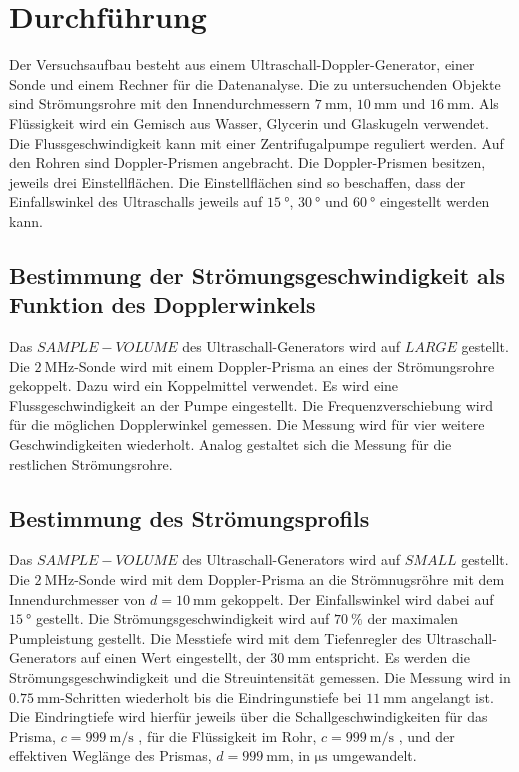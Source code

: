 \section{Durchführung}
\label{sec:Durchführung}
Der Versuchsaufbau besteht aus einem Ultraschall-Doppler-Generator, einer Sonde und einem Rechner für die Datenanalyse.
Die zu untersuchenden Objekte sind Strömungsrohre mit den Innendurchmessern $\SI{7}{\milli\meter}$, $\SI{10}{\milli\meter}$ und $\SI{16}{\milli\meter}$.
Als Flüssigkeit wird ein Gemisch aus Wasser, Glycerin und Glaskugeln verwendet.
Die Flussgeschwindigkeit kann mit einer Zentrifugalpumpe reguliert werden.
Auf den Rohren sind Doppler-Prismen angebracht.
Die Doppler-Prismen besitzen, jeweils drei Einstellflächen.
Die Einstellflächen sind so beschaffen, dass der Einfallswinkel des Ultraschalls jeweils auf $\SI{15}{\degree}$, $\SI{30}{\degree}$ und $\SI{60}{\degree}$ eingestellt werden kann.
\subsection{Bestimmung der Strömungsgeschwindigkeit als Funktion des Dopplerwinkels}
Das $SAMPLE-VOLUME$ des Ultraschall-Generators wird auf $LARGE$ gestellt.
Die $\SI{2}{\mega\hertz}$-Sonde wird mit einem Doppler-Prisma an eines der Strömungsrohre gekoppelt.
Dazu wird ein Koppelmittel verwendet.
Es wird eine Flussgeschwindigkeit an der Pumpe eingestellt.
Die Frequenzverschiebung wird für die möglichen Dopplerwinkel gemessen.
Die Messung wird für vier weitere Geschwindigkeiten wiederholt.
Analog gestaltet sich die Messung für die restlichen Strömungsrohre.
\subsection{Bestimmung des Strömungsprofils}
Das $SAMPLE-VOLUME$ des Ultraschall-Generators wird auf $SMALL$ gestellt.
Die $\SI{2}{\mega\hertz}$-Sonde wird mit dem Doppler-Prisma an die Strömnugsröhre mit dem Innendurchmesser von $d= \SI{10}{\milli\meter}$ gekoppelt.
Der Einfallswinkel wird dabei auf $\SI{15}{\degree}$ gestellt.
Die Strömungsgeschwindigkeit wird auf $\SI{70}{\percent}$ der maximalen Pumpleistung gestellt.
Die Messtiefe wird mit dem Tiefenregler des Ultraschall-Generators auf einen Wert eingestellt, der $\SI{30}{\milli\meter}$ entspricht.
Es werden die Strömungsgeschwindigkeit und die Streuintensität gemessen.
Die Messung wird in $\SI{0.75}{\milli\meter}$-Schritten wiederholt bis die Eindringunstiefe bei $\SI{11}{\milli\meter}$ angelangt ist.
Die Eindringtiefe wird hierfür jeweils über die Schallgeschwindigkeiten für das Prisma, 
$c=\SI{999}{\meter\per\second}$ \cite{prisma}, für die Flüssigkeit im Rohr, 
$c=\SI{999}{\meter\per\second}$ \cite{schlonze}, und der effektiven Weglänge des Prismas, $d=\SI{999}{\milli\meter}$, 
in $\si{\micro\second}$ umgewandelt.
